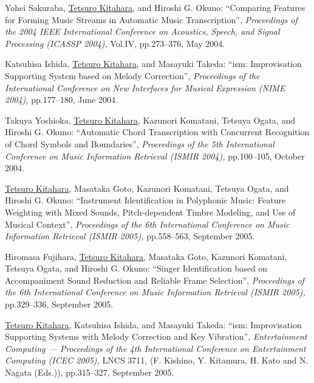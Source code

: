 \begin{Enumerate}
\item 
Yohei Sakuraba, 
\underline{Tetsuro Kitahara}, 
and 
Hiroshi
      G. Okuno: 
    ``Comparing Features for Forming Music Streams in Automatic Music Transcription'', 
    {\it Proceedings of
      the 2004 IEEE International Conference on Acoustics, Speech, and Signal Processing
          (ICASSP 2004),
        } Vol.IV, pp.273--376, May 2004. 

\item 
Katsuhisa
      Ishida, 
\underline{Tetsuro Kitahara}, 
and 
Masayuki Takeda: 
    ``ism: Improvisation Supporting System based on Melody Correction'', 
    {\it Proceedings of the International Conference on New
      Interfaces for Musical Expression 
          (NIME 2004),
        } pp.177--180, June 2004. 

\item 
Takuya Yoshioka, 
\underline{Tetsuro Kitahara}, 
Kazunori Komatani, 
Tetsuya
      Ogata, 
and 
Hiroshi
      G. Okuno: 
    ``Automatic Chord Transcription with Concurrent Recognition of Chord Symbols and Boundaries'', 
    {\it Proceedings of
      the 5th International Conference on Music Information Retrieval
          (ISMIR 2004),
        } pp.100--105, October 2004. 

\item 
\underline{Tetsuro Kitahara}, 
Masataka Goto, 
Kazunori Komatani, 
Tetsuya
      Ogata, 
and 
Hiroshi
      G. Okuno: 
    ``Instrument Identification in Polyphonic Music: Feature Weighting with Mixed Sounds,
      Pitch-dependent Timbre Modeling, and Use of Musical Context'', 
    {\it Proceedings of
      the 6th International Conference on Music Information Retrieval 
          (ISMIR 2005),
        } pp.558--563, September 2005. 

\item 
Hiromasa Fujihara, 
\underline{Tetsuro Kitahara}, 
Masataka Goto, 
Kazunori Komatani, 
Tetsuya
      Ogata, 
and 
Hiroshi
      G. Okuno: 
    ``Singer Identification based on Accompaniment Sound Reduction and Reliable Frame Selection'', 
    {\it Proceedings of
      the 6th International Conference on Music Information Retrieval 
          (ISMIR 2005),
        } pp.329--336, September 2005. 

\item 
\underline{Tetsuro Kitahara}, 
Katsuhisa
      Ishida, 
and 
Masayuki Takeda: 
    ``ism: Improvisation Supporting Systems with Melody Correction and Key Vibration'', 
    {\it Entertainment Computing --- Proceedings of the 4th International Conference on
      Entertainment Computing (ICEC 2005),
    } LNCS 3711, (F. Kishino, Y. Kitamura, H. Kato and N. Nagata (Eds.)), pp.315--327, September 2005. 


\end{Enumerate}
